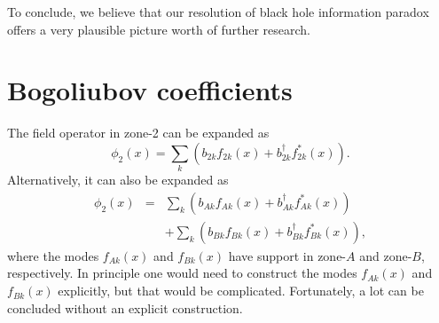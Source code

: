 \documentclass[aps,prd,onecolumn,groupedaddress,showkeys,12pt]{revtex4-2}
\begin{document}
To conclude, we believe that our resolution of black hole information paradox 
offers a very plausible picture worth of further research.
        

\appendix

\section{Bogoliubov coefficients}

The field operator in zone-2 can be expanded as \cite{bd}
\begin{equation}\label{ap1}
 \phi_2(x)=\sum_k \left( b_{2k} f_{2k}(x) + b_{2k}^\dagger f_{2k}^*(x) \right) .
\end{equation}
Alternatively, it can also be expanded as
\begin{eqnarray}\label{ap2}
 \phi_2(x) &=& \sum_k \left( b_{Ak} f_{Ak}(x) + b_{Ak}^\dagger f_{Ak}^*(x) \right)
\nonumber \\
& & + \sum_k \left( b_{Bk} f_{Bk}(x) + b_{Bk}^\dagger f_{Bk}^*(x) \right),
\end{eqnarray}
where the modes $f_{Ak}(x)$ and $f_{Bk}(x)$ have support in zone-$A$ and zone-$B$, respectively.
In principle one would need to construct the modes $f_{Ak}(x)$ and $f_{Bk}(x)$ explicitly, 
but that would be complicated. Fortunately, a lot can be concluded 
without an explicit construction.
\end{document}
